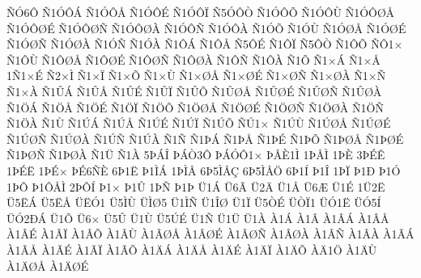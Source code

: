 {^^d1^^d36^^d4
^^d11^^d3^^d4^^c1
^^d11^^d3^^d4^^c5
^^d11^^d3^^d4^^c9
^^d11^^d3^^d4^^cf
^^d15^^d3^^d4^^d2
^^d11^^d3^^d4^^d5
^^d11^^d3^^d4^^d9
^^d11^^d3^^d4^^d8^^c5
^^d11^^d3^^d4^^d8^^c9
^^d11^^d3^^d4^^d8^^d1
^^d11^^d3^^d4^^d8^^c0
^^d11^^d3^^d4^^d1
^^d11^^d3^^d4^^c0
^^d11^^d3^^d5
^^d11^^d3^^d9
^^d11^^d3^^d8^^c5
^^d11^^d3^^d8^^c9
^^d11^^d3^^d8^^d1
^^d11^^d3^^d8^^c0
^^d11^^d3^^d1
^^d11^^d3^^c0
^^d11^^d4^^c1
^^d11^^d4^^c5
^^d15^^d4^^c9
^^d11^^d4^^cf
^^d15^^d4^^d2
^^d11^^d4^^d5
^^d1^^d41^^d7
^^d11^^d4^^d9
^^d11^^d4^^d8^^c5
^^d11^^d4^^d8^^c9
^^d11^^d4^^d8^^d1
^^d11^^d4^^d8^^c0
^^d11^^d4^^d1
^^d11^^d4^^c0
^^d11^^d5
^^d11^^d7^^c1
^^d11^^d7^^c5
1^^d11^^d7^^c9
^^d12^^d7^^cc
^^d11^^d7^^cf
^^d11^^d7^^d5
^^d11^^d7^^d9
^^d11^^d7^^d8^^c5
^^d11^^d7^^d8^^c9
^^d11^^d7^^d8^^d1
^^d11^^d7^^d8^^c0
^^d11^^d7^^d1
^^d11^^d7^^c0
^^d11^^db^^c1
^^d11^^db^^c5
^^d11^^db^^c9
^^d11^^db^^cf
^^d11^^db^^d5
^^d11^^db^^d8^^c5
^^d11^^db^^d8^^c9
^^d11^^db^^d8^^d1
^^d11^^db^^d8^^c0
^^d11^^d6^^c1
^^d11^^d6^^c5
^^d11^^d6^^c9
^^d11^^d6^^cf
^^d11^^d6^^d5
^^d11^^d6^^d8^^c5
^^d11^^d6^^d8^^c9
^^d11^^d6^^d8^^d1
^^d11^^d6^^d8^^c0
^^d11^^d6^^d1
^^d11^^d6^^c0
^^d11^^d9
^^d11^^da^^c1
^^d11^^da^^c5
^^d11^^da^^c9
^^d11^^da^^cf
^^d11^^da^^d5
^^d1^^da1^^d7
^^d11^^da^^d9
^^d11^^da^^d8^^c5
^^d11^^da^^d8^^c9
^^d11^^da^^d8^^d1
^^d11^^da^^d8^^c0
^^d11^^da^^d1
^^d11^^da^^c0
^^d11^^d1
^^d11^^de^^c1
^^d11^^de^^c5
^^d11^^de^^c9
^^d11^^de^^d5
^^d11^^de^^d8^^c5
^^d11^^de^^d8^^c9
^^d11^^de^^d8^^d1
^^d11^^de^^d8^^c0
^^d11^^dc
^^d11^^c0
5^^de^^c1^^ce
^^de^^c1^^d23^^d4
^^de^^c1^^d3^^d41^^d7
^^de^^c5^^c81^^cc
1^^de^^c5^^cc
1^^de^^c8
3^^de^^c9^^ca
1^^de^^c9^^cb
1^^de^^c9^^d7
^^de^^c96^^d1^^c8
6^^de1^^cb
^^de1^^cc^^c1
1^^de^^cc^^c5
6^^de5^^cc^^c5^^c7
6^^de5^^cc^^c5^^d6
6^^de1^^cd
^^de1^^ce
1^^de^^cf
^^de1^^d0
^^de1^^d3
1^^de^^d4
^^de1^^d4^^c5^^cc
2^^de^^d4^^cd
^^de1^^d7
^^de1^^db
1^^de^^d1
^^de1^^de
^^dc1^^c1
^^dc6^^c3
^^dc2^^c4
^^dc1^^c5
^^dc6^^c6
^^dc1^^c9
1^^dc2^^cb
^^dc5^^cb^^c1
^^dc5^^cb^^c5
^^dc^^cb^^d31
^^dc5^^cc^^d9
^^dc^^cc^^d85
^^dc1^^cc^^d1
^^dc1^^ce^^d8
^^dc1^^cf
^^dc5^^d2^^c9
^^dc^^d2^^cf1
^^dc^^d31^^cb
^^dc^^d35^^cd
^^dc^^d32^^d0^^c1
^^dc1^^d5
^^dc6^^d7
^^dc5^^db
^^dc1^^d9
^^dc5^^da^^c9
^^dc1^^d1
^^dc1^^dc
^^dc1^^c0
^^c01^^c1
^^c01^^c2
^^c01^^c2^^c1
^^c01^^c2^^c5
^^c01^^c2^^c9
^^c01^^c2^^cf
^^c01^^c2^^d5
^^c01^^c2^^d9
^^c01^^c2^^d8^^c5
^^c01^^c2^^d8^^c9
^^c01^^c2^^d8^^d1
^^c01^^c2^^d8^^c0
^^c01^^c2^^d1
^^c01^^c2^^c0
^^c01^^c3^^c1
^^c01^^c3^^c5
^^c01^^c3^^c9
^^c01^^c3^^cf
^^c01^^c3^^d5
^^c01^^c4^^c1
^^c01^^c4^^c5
^^c01^^c4^^c9
^^c01^^c4^^cf
^^c01^^c4^^d5
^^c0^^c41^^d6
^^c01^^c4^^d9
^^c01^^c4^^d8^^c5
^^c01^^c4^^d8^^c9
}
